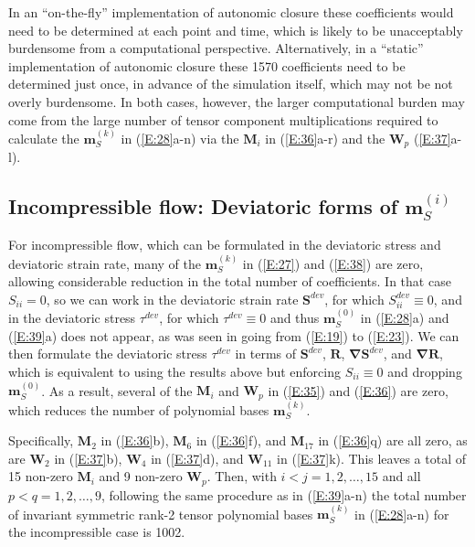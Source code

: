 In an ``on-the-fly'' implementation of autonomic closure these coefficients would need to be determined at each point and time, which is likely to be unacceptably burdensome from a computational perspective. Alternatively, in a ``static'' implementation of autonomic closure these 1570 coefficients need to be determined just once, in advance of the simulation itself, which may not be not overly burdensome.  In both cases, however, the larger computational burden may come from the large number of tensor component multiplications required to calculate the $\mathbf{m}^{(k)}_S$  in (\ref{E:28}a-n) via the  $\mathbf{M}_i$ in (\ref{E:36}a-r) and the $\mathbf{W}_p$ (\ref{E:37}a-l).


\subsection{Incompressible flow: Deviatoric forms of $\mathbf{m}^{(i)}_S$ }
\label{sec:2F}

For incompressible flow, which can be formulated in the deviatoric stress and deviatoric strain rate, many of the $\mathbf{m}^{(k)}_S$  in (\ref{E:27}) and (\ref{E:38}) are zero, allowing considerable reduction in the total number of coefficients.  In that case $S_{ii} = 0$, so we can work in the deviatoric strain rate $\mathbf{S}^{dev}$, for which $S^{dev}_{ii} \equiv 0$, and in the deviatoric stress $\tau^{dev}$, for which $\tau^{dev} \equiv 0$  and thus $\mathbf{m}^{(0)}_S$  in (\ref{E:28}a) and (\ref{E:39}a) does not appear, as was seen in going from (\ref{E:19}) to (\ref{E:23}).  We can then formulate the deviatoric stress $\tau^{dev}$  in terms of $\mathbf{S}^{dev}$, $\mathbf{R}$, $\mathbf{\nabla S}^{dev}$, and $\mathbf{\nabla R}$, which is equivalent to using the results above but enforcing $S_{ii} \equiv 0$  and dropping $\mathbf{m}^{(0)}_S$.  As a result, several of the  $\mathbf{M}_i$ and $\mathbf{W}_p$ in (\ref{E:35}) and (\ref{E:36}) are zero, which reduces the number of polynomial bases $\mathbf{m}^{(k)}_S$.  

Specifically,  $\mathbf{M}_2$ in (\ref{E:36}b),  $\mathbf{M}_6$ in (\ref{E:36}f), and $\mathbf{M}_{17}$  in (\ref{E:36}q) are all zero, as are $\mathbf{W}_2$  in (\ref{E:37}b),  $\mathbf{W}_4$ in (\ref{E:37}d), and $\mathbf{W}_{11}$  in (\ref{E:37}k).  This leaves a total of 15 non-zero $\mathbf{M}_i$  and 9 non-zero $\mathbf{W}_p$.  Then, with $i<j = 1,2,\ldots,15$  and all $p<q = 1,2,\ldots,9$, following the same procedure as in (\ref{E:39}a-n) the total number of invariant symmetric rank-2 tensor polynomial bases   $\mathbf{m}^{(k)}_S$ in (\ref{E:28}a-n) for the incompressible case is 1002.  



